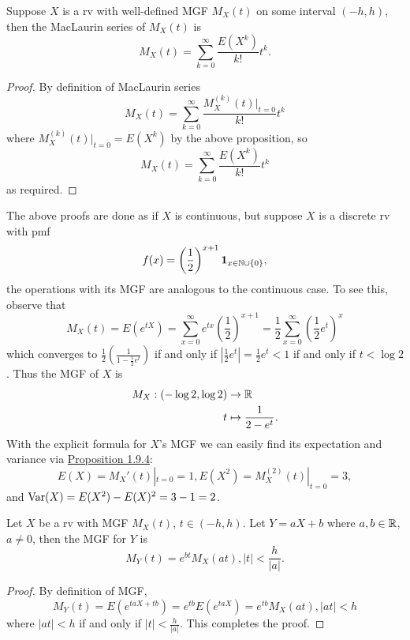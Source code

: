 \documentclass[11pt,fleqn]{book} %
\begin{document}
\begin{corollary} 
Suppose \(X\) is a rv with well-defined MGF \(M_X(t)\) on some interval \((-h, h)\), then the MacLaurin series of \(M_X(t)\) is
\[
M_X(t) = \sum_{k=0}^\infty \frac{E(X^k)}{k!}t^k.
\]
\end{corollary}
\begin{proof} By definition of MacLaurin series
\[
M_X(t) = \sum_{k=0}^\infty \frac{M_X^{(k)}(t)|_{t = 0}}{k!}t^k
\]
where \(M_X^{(k)}(t)|_{t=0} = E(X^k)\) by the above proposition, so
\[
M_X(t) = \sum_{k=0}^\infty \frac{E(X^k)}{k!}t^k
\]
as required.
\end{proof}

\begin{example} The above proofs are done as if \(X\) is continuous, but suppose \(X\) is a discrete rv with pmf
\[
f(x) = \left(\frac 1 2\right)^{x + 1}\mathbf{1}_{x \in \mathbb{N}\cup\{0\}},
\]
the operations with its MGF are analogous to the continuous case. To see this, observe that
\[
M_X(t) = E(e^{tX}) = \sum_{x=0}^\infty e^{tx}\left(\frac 1 2\right)^{x + 1} = \frac 1 2 \sum_{x=0}^\infty \left(\frac 1 2 e^t\right)^x
\]
which converges to \(\frac 1 2 \left(\frac 1{1 - \frac 1 2 e^t}\right)\) if and only if \(\left|\frac 1 2 e^t\right| = \frac 1 2 e^t < 1\) if and only if \(t < \log 2\). Thus the MGF of \(X\) is
\[
\begin{aligned}
M_X: (-\log 2, \log 2) &\rightarrow \mathbb{R} \\
t &\mapsto \frac{1}{2 - e^t}.
\end{aligned}
\]
\indent With the explicit formula for \(X\)'s MGF we can easily find its expectation and variance via \hyperref[prop:194]{Proposition 1.9.4}:
\[
E(X) = M_X'(t)|_{t=0} = 1, E(X^2) = M_X^{(2)}(t)|_{t=0} = 3,
\]
and \(\operatorname{Var}(X) = E(X^2) - E(X)^2 = 3 - 1 = 2\).
\end{example}

\begin{theorem} \label{thm:197}
Let \(X\) be a rv with MGF \(M_X(t)\), \(t \in (-h, h)\). Let \(Y = aX + b\) where \(a, b \in \mathbb{R}\), \(a \neq 0\), then the MGF for \(Y\) is
\[
M_Y(t) = e^{bt}M_X(at), |t| < \frac{h}{|a|}.
\]
\end{theorem}
\begin{proof} By definition of MGF, 
\[
M_Y(t) = E(e^{taX + tb}) = e^{tb}E(e^{taX}) = e^{tb}M_X(at), |at| < h
\]
where \(|at| < h\) if and only if \(|t| < \frac{h}{|a|}\). This completes the proof.
\end{proof}
\end{document}

